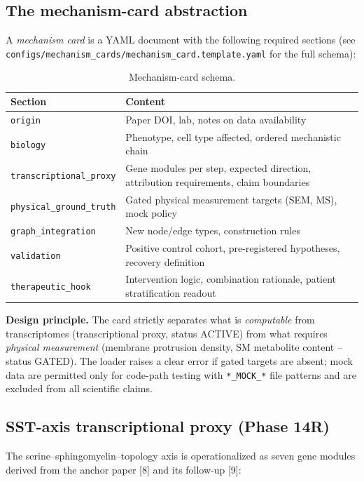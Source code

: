 \documentclass[modern,large,numbered,nocrop]{oup-authoring-template}
\begin{document}
\subsection{The mechanism-card abstraction}

A \textit{mechanism card} is a YAML document with the following required sections (see \texttt{configs/mechanism\_cards/mechanism\_card.template.yaml} for the full schema):

\begin{table}[htbp]
\caption{Mechanism-card schema.}
\small
\begin{tabularx}{\textwidth}{@{}lX@{}}
\toprule
Section & Content \\
\midrule
\texttt{origin} & Paper DOI, lab, notes on data availability \\
\texttt{biology} & Phenotype, cell type affected, ordered mechanistic chain \\
\texttt{transcriptional\_proxy} & Gene modules per step, expected direction, attribution requirements, claim boundaries \\
\texttt{physical\_ground\_truth} & Gated physical measurement targets (SEM, MS), mock policy \\
\texttt{graph\_integration} & New node/edge types, construction rules \\
\texttt{validation} & Positive control cohort, pre-registered hypotheses, recovery definition \\
\texttt{therapeutic\_hook} & Intervention logic, combination rationale, patient stratification readout \\
\bottomrule
\end{tabularx}
\end{table}

\textbf{Design principle.} The card strictly separates what is \textit{computable} from transcriptomes (transcriptional proxy, status ACTIVE) from what requires \textit{physical measurement} (membrane protrusion density, SM metabolite content -- status GATED). The loader raises a clear error if gated targets are absent; mock data are permitted only for code-path testing with \texttt{*\_MOCK\_*} file patterns and are excluded from all scientific claims.

\subsection{SST-axis transcriptional proxy (Phase 14R)}

The serine--sphingomyelin--topology axis is operationalized as seven gene modules derived from the anchor paper [8] and its follow-up [9]:
\end{document}
